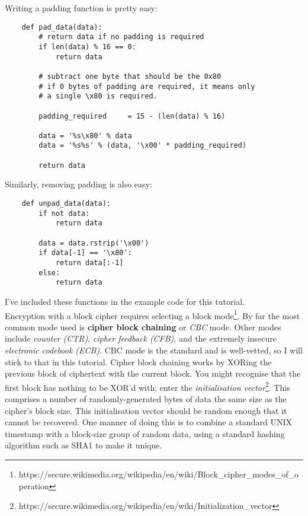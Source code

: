 \documentclass[letterpaper,10pt]{article}
\begin{document}
Writing a padding function is pretty easy:   
\begin{verbatim}
    def pad_data(data):
        # return data if no padding is required
        if len(data) % 16 == 0: 
            return data

        # subtract one byte that should be the 0x80
        # if 0 bytes of padding are required, it means only
        # a single \x80 is required.

        padding_required     = 15 - (len(data) % 16)

        data = '%s\x80' % data
        data = '%s%s' % (data, '\x00' * padding_required)

        return data
\end{verbatim}

Similarly, removing padding is also easy:
\begin{verbatim}
    def unpad_data(data):
        if not data: 
            return data

        data = data.rstrip('\x00')
        if data[-1] == '\x80':
            return data[:-1]
        else:
            return data
\end{verbatim}

I've included these functions in the example code for this tutorial.\\ 


Encryption with a block cipher requires selecting a 
block mode\footnote{https://secure.wikimedia.org/wikipedia/en/wiki/Block\_cipher\_modes\_of\_operation}. 
By far the most common mode used is \textbf{cipher block chaining} or 
\textit{CBC} mode. Other modes include \textit{counter (CTR)}, 
\textit{cipher feedback (CFB)}, and the extremely insecure
\textit{electronic codebook (ECB)}. CBC mode is the standard and is 
well-vetted, so I will stick to that in this tutorial. Cipher block chaining 
works by XORing the previous block of ciphertext with the current block. You 
might recognise that the first block has nothing to be XOR'd with; enter the 
\textit{initialisation vector}\footnote{https://secure.wikimedia.org/wikipedia/en/wiki/Initialization\_vector}. 
This comprises a number of randomly-generated bytes of data the same
size as the cipher's block size. This initialisation vector should be random 
enough that it cannot be recovered. One manner of doing this is to combine a
standard UNIX timestamp with a block-size group of random data, using a standard
hashing algorithm such as SHA1 to make it unique. 
\end{document}
